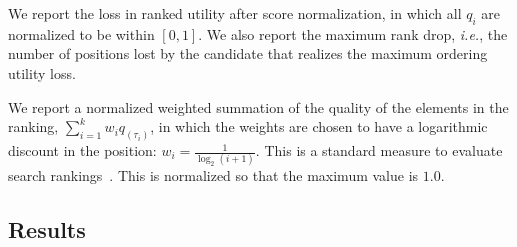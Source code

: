  We report the loss in ranked utility after score normalization, in which all $q_i$ are normalized to be within $[0, 1]$.
%
We also report the maximum rank drop, {\em i.e.}, the number of positions lost by the candidate that realizes the maximum ordering utility loss.

%
We report a normalized weighted summation of the quality of the elements in the ranking, $\sum_{i=1}^{k} w_i q_{(\tau_i)}$, in which the weights are chosen to have a logarithmic discount in the position:  $w_i = \frac{1}{\log_2 (i+1)}$. This is a standard measure to evaluate search rankings~\cite{jarvelin2002cumulated}.
%
This is normalized so that the maximum value is $1.0$.

\subsection{Results}\label{sec:experiments-results}

